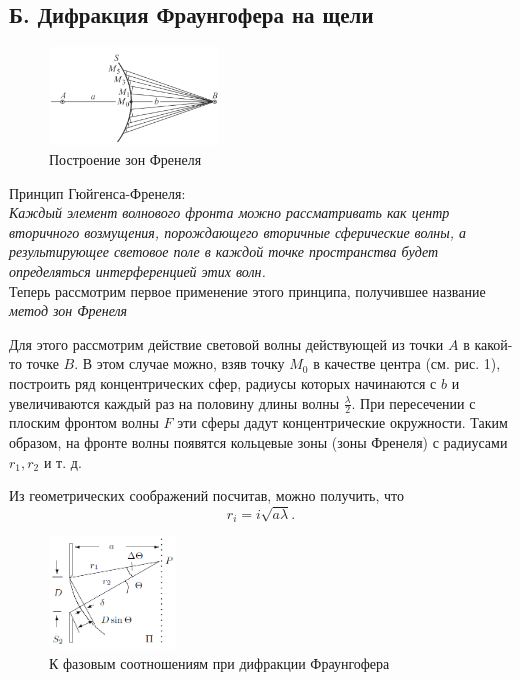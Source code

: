 \documentclass[a4paper, 12pt]{article}%
\begin{document}
	\subsection*{Б. Дифракция Фраунгофера на щели}
	\begin{figure}
		\begin{center}
			\includegraphics[width = 0.4\textwidth]{images/431-2.png}
		\end{center}
		\caption{Построение зон Френеля}
	\end{figure}
	Принцип Гюйгенса-Френеля:\\
	\textit{Каждый элемент волнового фронта можно рассматривать как центр  вторичного возмущения, порождающего вторичные сферические волны, а результирующее световое поле  в каждой точке пространства будет определяться интерференцией этих волн.}\\
	Теперь рассмотрим первое применение этого принципа, получившее название \textit{метод зон Френеля}
	

	Для этого рассмотрим действие световой волны действующей из точки $A$ в какой-то точке $B$.
	В этом случае можно, взяв точку $M_0$ в качестве центра (см. рис. 1), построить ряд концентрических сфер, радиусы которых начинаются с $b$ и увеличиваются каждый раз на половину длины волны $\frac{\lambda}{2}$. При пересечении с плоским фронтом волны $F$ эти сферы дадут концентрические окружности. Таким образом, на фронте волны появятся кольцевые зоны (зоны Френеля) с радиусами $r_1, r_2$ и т. д.
	
	Из геометрических соображений посчитав, можно получить, что 
	\begin{equation}
	r_i = i \sqrt{a \lambda}.
	\end{equation}
		\begin{figure}
		\begin{center}
			\includegraphics[width = 0.3\textwidth]{images/431-3.png}
		\end{center}
		\caption{К фазовым соотношениям при дифракции Фраунгофера}
	\end{figure}
	
\end{document}
